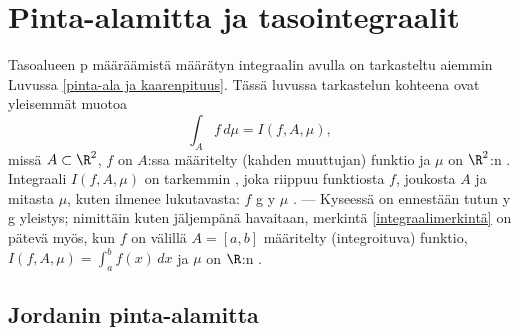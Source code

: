 \section{Pinta-alamitta ja tasointegraalit} \label{tasointegraalit}
\alku {}

Tasoalueen p määräämistä määrätyn integraalin avulla on tarkasteltu aiemmin
Luvussa \ref{pinta-ala ja kaarenpituus}. Tässä luvussa tarkastelun kohteena ovat yleisemmät
 muotoa
\begin{equation} \label{integraalimerkintä}
\int_A f\, d\mu=I(f,A,\mu), \tag{$\star$}
\end{equation}
missä $A\subset\R^2$, $f$ on $A$:ssa määritelty (kahden muuttujan) funktio ja $\mu$ on $\R^2$:n
. Integraali $I(f,A,\mu)$ on tarkemmin ,
joka riippuu funktiosta $f$, joukosta $A$ ja mitasta $\mu$, kuten ilmenee lukutavasta:
$f$ g y   $\mu$
. --- Kyseessä on ennestään tutun y g
yleistys; nimittäin kuten jäljempänä havaitaan, merkintä \eqref{integraalimerkintä} on pätevä
myös, kun $f$ on välillä $A=[a,b]$ määritelty (integroituva) funktio,
$I(f,A,\mu)=\int_a^b f(x)\,dx$ ja $\mu$ on $\R$:n .

\subsection*{Jordanin pinta-alamitta}

